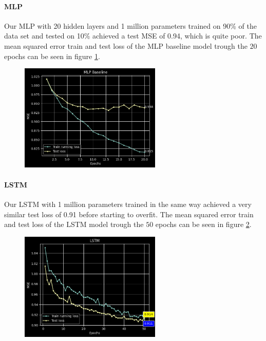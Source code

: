 \documentclass[11pt]{article}
\begin{document}
\paragraph{MLP} Our MLP with 20 hidden layers and 1 million parameters trained on 90\% of the data set and tested on 10\% achieved a test MSE of 0.94, which is quite poor. The  mean squared error train and test loss of the MLP baseline model trough the $20$ epochs can be seen in figure \ref{fig:mlp}.
\begin{figure}[H]
    \caption{}
    \centering
    \includegraphics[width=0.6\textwidth]{images/mlp.png}
    \label{fig:mlp}
\end{figure}

\paragraph{LSTM} Our LSTM with 1 million parameters trained in the same way achieved a very similar test loss of 0.91 before starting to overfit.
The  mean squared error train and test loss of the LSTM model trough the $50$ epochs can be seen in figure \ref{fig:lstm}.
\begin{figure}[H]
    \caption{}
    \centering
    \includegraphics[width=0.6\textwidth]{images/lstm.png}
    \label{fig:lstm}
\end{figure}
\end{document}
